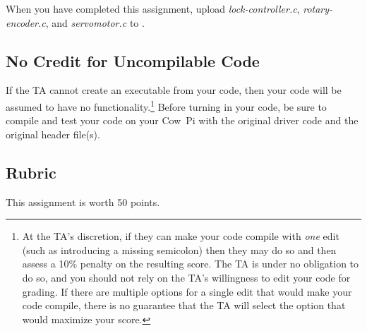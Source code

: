 When you have completed this assignment, upload \textit{lock-controller.c}, \textit{rotary-encoder.c}, and \textit{servomotor.c} to \filesubmission.

\subsection*{No Credit for Uncompilable Code}
If the TA cannot create an executable from your code, then your code will be assumed to have no functionality.\footnote{
    At the TA's discretion, if they can make your code compile with \textit{one} edit (such as introducing a missing semicolon) then they may do so and then assess a 10\% penalty on the resulting score.
    The TA is under no obligation to do so, and you should not rely on the TA's willingness to edit your code for grading.
    If there are multiple options for a single edit that would make your code compile, there is no guarantee that the TA will select the option that would maximize your score.
}
Before turning in your code, be sure to compile and test your code on your Cow~Pi with the original driver code and the original header file(s).

\interruptlablatepolicy

\subsection*{Rubric}

This assignment is worth 50 points.

